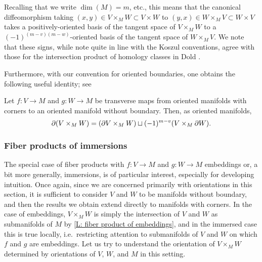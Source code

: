 Recalling that we write $\dim(M)=m$, etc., this means that the canonical diffeomorphism taking $(x,y) \in V \times_M W \subset V \times W$ to $(y,x) \in W \times_M V \subset W \times V$ takes a positively-oriented basis of the tangent space of $V \times_M W$ to a $(-1)^{(m-v)(m-w)}$-oriented basis of the tangent space of $W \times_M V$.
We note that these signs, while note quite in line with the Koszul conventions, agree with those for the intersection product of homology classes in Dold \cite[Section VIII.13]{Dol72}.

Furthermore, with our convention for oriented boundaries, one obtains the following useful identity; see \cite[Propositions 7.4 and 7.5]{Joy12}

\begin{proposition}\label{P: oriented fiber boundary}
	Let $f \colon V \to M$ and $g \colon W \to M$ be transverse maps from oriented manifolds with corners to an oriented manifold without boundary.
	Then, as oriented manifolds,
	\begin{equation*}
		\partial (V \times_M W) = (\partial V \times_M W) \sqcup (-1)^{m-v}(V \times_M \partial W).
	\end{equation*}
\end{proposition}

\subsubsection{Fiber products of immersions}

The special case of fiber products with $f \colon V \to M$ and $g \colon W \to M$ embeddings or, a bit more generally, immersions, is of particular interest, especially for developing intuition.
Once again, since we are concerned primarily with orientations in this section, it is sufficient to consider $V$ and $W$ to be manifolds without boundary, and then the results we obtain extend directly to manifolds with corners.
In the case of embeddings, $V \times_M W$ is simply the intersection of $V$ and $W$ as submanifolds of $M$ by \cref{L: fiber product of embeddings}, and in the immersed case this is true locally, i.e.\ restricting attention to submanifolds of $V$ and $W$ on which $f$ and $g$ are embeddings.
Let us try to understand the orientation of $V \times_M W$ determined by orientations of $V$, $W$, and $M$ in this setting.

